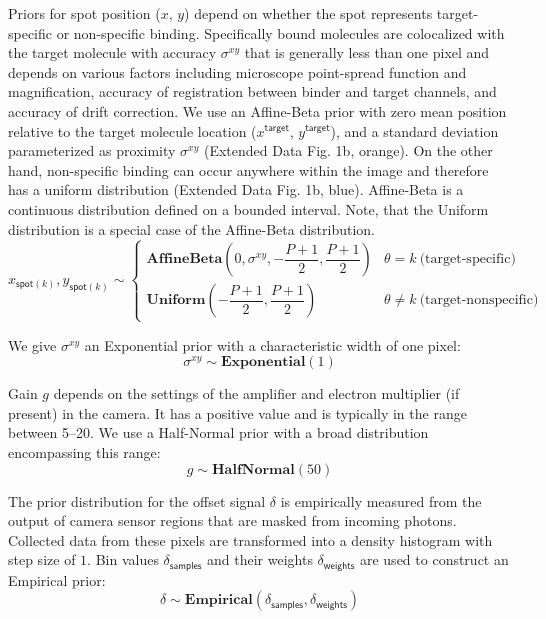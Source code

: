 Priors for spot position ($x$, $y$) depend on whether the spot represents target-specific or non-specific binding. Specifically bound molecules are colocalized with the target molecule with accuracy $\sigma^{xy}$ that is generally less than one pixel and depends on various factors including microscope point-spread function and magnification, accuracy of registration between binder and target channels, and accuracy of drift correction. We use an Affine-Beta prior with zero mean position relative to the target molecule location ($x^\mathsf{target}$, $y^\mathsf{target}$), and a standard deviation parameterized as proximity $\sigma^{xy} $ (Extended Data Fig. 1b, orange). On the other hand, non-specific binding can occur anywhere within the image and therefore has a uniform distribution (Extended Data Fig. 1b, blue). Affine-Beta is a continuous distribution defined on a bounded interval. Note, that the Uniform distribution is a special case of the Affine-Beta distribution.
%
\begin{equation}
    x_{\mathsf{spot}(k)}, y_{\mathsf{spot}(k)} \sim
    \begin{cases}
        \mathbf{AffineBeta}\left( 0, \sigma^{xy}, -\dfrac{P+1}{2}, \dfrac{P+1}{2} \right) & \theta = k ~\textrm{(target-specific)} \\
        \mathbf{Uniform}\left(-\dfrac{P+1}{2}, \dfrac{P+1}{2} \right) & \theta \neq k ~\text{(target-nonspecific)}
    \end{cases}
\end{equation}

We give $\sigma^{xy}$ an Exponential prior with a characteristic width of one pixel:
%
\begin{equation}
    \sigma^{xy} \sim \mathbf{Exponential}(1)
\end{equation}

Gain $g$ depends on the settings of the amplifier and electron multiplier (if present) in the camera. It has a positive value and is typically in the range between 5--20. We use a Half-Normal prior with a broad distribution encompassing this range:
%
\begin{equation}
    g \sim \mathbf{HalfNormal}(50)
\end{equation}

The prior distribution for the offset signal $\delta$ is empirically measured from the output of camera sensor regions that are masked from incoming photons. Collected data from these pixels are transformed into a density histogram with step size of $1$. Bin values $\delta_\mathsf{samples}$ and their weights $\delta_\mathsf{weights}$ are used to construct an Empirical prior:
%
\begin{equation}
    \delta \sim \mathbf{Empirical}(\delta_\mathsf{samples}, \delta_\mathsf{weights})
\end{equation}

